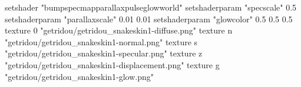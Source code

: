 setshader "bumpspecmapparallaxpulseglowworld"
setshaderparam "specscale" 0.5
setshaderparam "parallaxscale" 0.01 0.01
setshaderparam "glowcolor" 0.5 0.5 0.5
texture 0 "getridou/getridou_snakeskin1-diffuse.png"
texture n "getridou/getridou_snakeskin1-normal.png"
texture s "getridou/getridou_snakeskin1-specular.png"
texture z "getridou/getridou_snakeskin1-displacement.png"
texture g "getridou/getridou_snakeskin1-glow.png"
